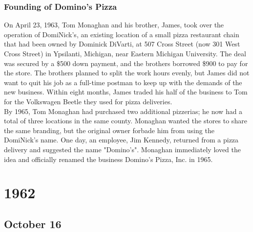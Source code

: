 \documentclass[11pt]{report}
\begin{document}
\subsection{Founding of Domino's Pizza}
On April 23, 1963, Tom Monaghan and his brother, James, took over the operation of DomiNick's, an existing location of a small pizza restaurant chain that had been owned by Dominick DiVarti, at 507 Cross Street (now 301 West Cross Street) in Ypsilanti, Michigan, near Eastern Michigan University. The deal was secured by a \$500 down payment, and the brothers borrowed \$900 to pay for the store. The brothers planned to split the work hours evenly, but James did not want to quit his job as a full-time postman to keep up with the demands of the new business. Within eight months, James traded his half of the business to Tom for the Volkswagen Beetle they used for pizza deliveries.\\ \indent By 1965, Tom Monaghan had purchased two additional pizzerias; he now had a total of three locations in the same county. Monaghan wanted the stores to share the same branding, but the original owner forbade him from using the DomiNick's name. One day, an employee, Jim Kennedy, returned from a pizza delivery and suggested the name "Domino's". Monaghan immediately loved the idea and officially renamed the business Domino's Pizza, Inc. in 1965.

\chapter{1962}
\section{October 16}
\end{document}
